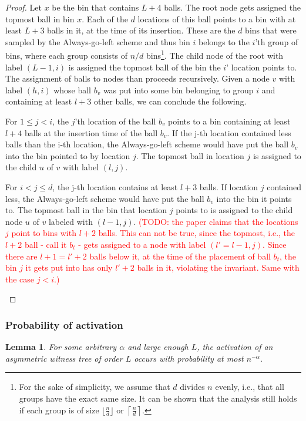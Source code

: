 \documentclass[a4paper,12pt]{article}
\newcommand\todo[1]{\textcolor{red}{(TODO: #1)}}
\newtheorem{lemma}{Lemma}
\begin{document}
\begin{proof}
Let $x$ be the bin that contains $L+4$ balls. The root node gets assigned the topmost ball in bin $x$. Each of the $d$ locations of this ball points to a bin with at least $L+3$ balls in it, at the time of its insertion. These are the $d$ bins that were sampled by the Always-go-left scheme and thus bin $i$ belongs to the $i$'th group of bins, where each group consists of $n/d$ bins\footnote{For the sake of simplicity, we assume that $d$ divides $n$ evenly, i.e., that all groups have the exact same size. It can be shown that the analysis still holds if each group is of size $\lfloor\frac{n}{d}\rfloor$ or $\left\lceil\frac{n}{d}\right\rceil$.}. The child node of the root with label $(L-1, i)$ is assigned the topmost ball of the bin the $i$' location points to. The assignment of balls to nodes than proceeds recursively. Given a node $v$ with label $(h, i)$ whose ball $b_v$ was put into some bin belonging to group $i$ and containing at least $l+3$ other balls, we can conclude the following.
\begin{compactitem}
\item For $1\leq j < i$, the $j$'th location of the ball $b_v$ points to a bin containing at least $l+4$ balls at the insertion time of the ball $b_v$. If the j-th location contained less balls than the i-th location, the Always-go-left scheme would have put the ball $b_v$ into the bin pointed to by location $j$. The topmost ball in location $j$ is assigned to the  child $u$ of $v$ with label $(l,j)$. 
\item For $i < j \leq d$, the j-th location contains at least $l+3$ balls. If location $j$ contained less, the Always-go-left scheme would have put the ball $b_v$ into the bin it points to. The topmost ball in the bin that location $j$ points to is assigned to the child node $u$ of $v$ labeled with $(l-1, j)$. \todo{the paper claims that the locations $j$ point to bins with $l+2$ balls. This can not be true, since the topmost, i.e., the $l+2$ ball - call it $b_t$ - gets assigned to a node with label $(l'=l-1, j)$. Since there are $l+1=l'+2$ balls below it, at the time of the placement of ball $b_t$, the bin $j$ it gets put into has only $l'+2$ balls in it, violating the invariant. Same with the case $j<i$.} 
\end{compactitem}
\end{proof}

\subsubsection{Probability of activation}
\label{sec:analysis:probabilityAsymWT}
\begin{lemma}\label{lemma:awt:activation}
For some arbitrary $\alpha$ and large enough $L$, the activation of an asymmetric witness tree of order $L$ occurs with probability at most $n^{-\alpha}$.
\end{lemma}
\end{document}
